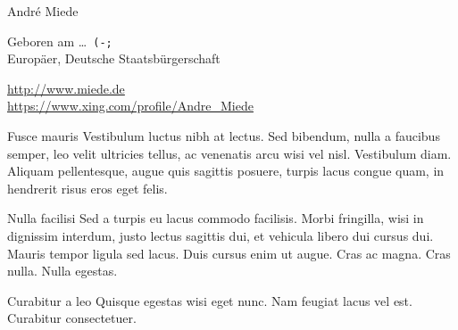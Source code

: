 \documentclass[fontsize=10pt,paper=a4]{scrartcl}
\begin{document}
    \pagestyle{plain}
    \begin{cv}{}
        \begin{cvlist}{}\label{PersDat}  %
            \item   Andr\'e Miede
            \item   Geboren am \dots\ \texttt{(-;} \\
                    Europ\"aer, Deutsche Staatsb\"urgerschaft
            \item   \url{http://www.miede.de} \\
                    \url{https://www.xing.com/profile/Andre_Miede}
        \end{cvlist}

        \begin{cvlist}{}\label{irgendwas}
            \item[Fusce mauris]   Vestibulum luctus nibh at lectus. Sed bibendum, nulla a faucibus semper, leo velit ultricies tellus, ac venenatis arcu wisi vel nisl. Vestibulum diam. Aliquam pellentesque, augue quis sagittis posuere, turpis lacus congue quam, in hendrerit risus eros eget felis. 
            \item[Nulla facilisi] Sed a turpis eu lacus commodo facilisis. Morbi fringilla, wisi in dignissim interdum, justo lectus sagittis dui, et vehicula libero dui cursus dui. Mauris tempor ligula sed lacus. Duis cursus enim ut augue. Cras ac magna. Cras nulla. Nulla egestas. 
            \item[Curabitur a leo] Quisque egestas wisi eget nunc. Nam feugiat lacus vel est. Curabitur consectetuer.
        \end{cvlist}
    \end{cv}
\end{document}
